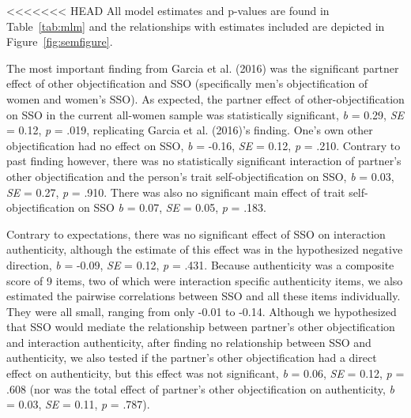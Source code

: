 \documentclass[
  man]{apa6}
\begin{document}
<<<<<<< HEAD
All model estimates and p-values are found in Table~\ref{tab:mlm} and the relationships with estimates included are depicted in Figure~\ref{fig:semfigure}.

The most important finding from Garcia et al. (2016) was the significant partner effect of other objectification and SSO (specifically men's objectification of women and women's SSO). As expected, the partner effect of other-objectification on SSO in the current all-women sample was statistically significant, \emph{b} = 0.29, \emph{SE} = 0.12, \emph{p} = .019, replicating Garcia et al. (2016)'s finding. One's own other objectification had no effect on SSO, \emph{b} = -0.16, \emph{SE} = 0.12, \emph{p} = .210. Contrary to past finding however, there was no statistically significant interaction of partner's other objectification and the person's trait self-objectification on SSO, \emph{b} = 0.03, \emph{SE} = 0.27, \emph{p} = .910. There was also no significant main effect of trait self-objectification on SSO \emph{b} = 0.07, \emph{SE} = 0.05, \emph{p} = .183.

Contrary to expectations, there was no significant effect of SSO on interaction authenticity, although the estimate of this effect was in the hypothesized negative direction, \emph{b} = -0.09, \emph{SE} = 0.12, \emph{p} = .431. Because authenticity was a composite score of 9 items, two of which were interaction specific authenticity items, we also estimated the pairwise correlations between SSO and all these items individually. They were all small, ranging from only -0.01 to -0.14. Although we hypothesized that SSO would mediate the relationship between partner's other objectification and interaction authenticity, after finding no relationship between SSO and authenticity, we also tested if the partner's other objectification had a direct effect on authenticity, but this effect was not significant, \emph{b} = 0.06, \emph{SE} = 0.12, \emph{p} = .608 (nor was the total effect of partner's other objectification on authenticity, \emph{b} = 0.03, \emph{SE} = 0.11, \emph{p} = .787).
\end{document}
